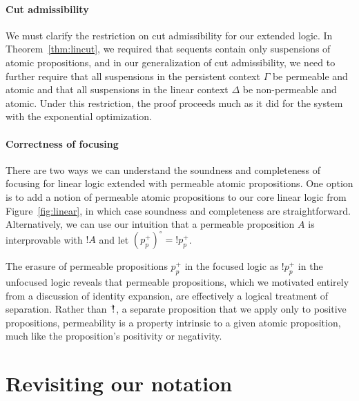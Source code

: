 \paragraph{Cut admissibility}
We must clarify the restriction on cut admissibility for our extended
logic. In Theorem~\ref{thm:lincut}, we required that sequents contain
only suspensions of atomic propositions, and in our generalization of
cut admissibility, we need to further require that all suspensions in
the persistent context $\Gamma$ be permeable and atomic and that all
suspensions in the linear context $\Delta$ be non-permeable and
atomic.  Under this restriction, the proof proceeds much as it did for
the system with the exponential optimization.

\paragraph{Correctness of focusing} There are two ways we can
understand the soundness and completeness of focusing for linear logic
extended with permeable atomic propositions. One option is to add a
notion of permeable atomic propositions to our core linear logic from
Figure~\ref{fig:linear}, in which case soundness and completeness are
straightforward. Alternatively, we can use our intuition that a
permeable proposition $A$ is interprovable with ${!}A$ and let
$(p^+_p)^\circ = {!}p^+_p$. 

The erasure of permeable propositions $p^+_p$ in the focused
logic as ${!}p^+_p$ in the unfocused logic reveals that
permeable propositions, which we motivated entirely from a discussion
of identity expansion, are effectively a logical treatment of
separation. Rather than ${\mbox{\hspace{2pt}$\mathbb !$\hspace{-5pt}$^+$\hspace{-1pt}}}$, a separate proposition that we
apply only to positive propositions, permeability is a
property intrinsic to a given atomic proposition, much like the
proposition's positivity or negativity.

\section{Revisiting our notation}
\label{sec:linnote}

